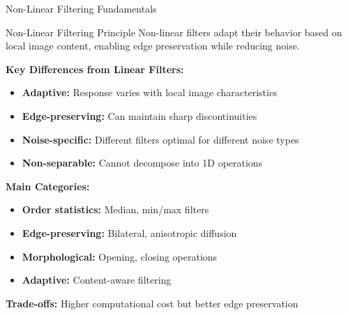 \documentclass[aspectratio=169,10pt]{beamer}
\begin{document}
\begin{frame}{Non-Linear Filtering Fundamentals}
\begin{alertblock}{Non-Linear Filtering Principle}
Non-linear filters adapt their behavior based on local image content, enabling edge preservation while reducing noise.
\end{alertblock}

\textbf{Key Differences from Linear Filters:}
\begin{itemize}
\item \textbf{Adaptive:} Response varies with local image characteristics
\item \textbf{Edge-preserving:} Can maintain sharp discontinuities
\item \textbf{Noise-specific:} Different filters optimal for different noise types
\item \textbf{Non-separable:} Cannot decompose into 1D operations
\end{itemize}

\textbf{Main Categories:}
\begin{itemize}
\item \textbf{Order statistics:} Median, min/max filters
\item \textbf{Edge-preserving:} Bilateral, anisotropic diffusion
\item \textbf{Morphological:} Opening, closing operations
\item \textbf{Adaptive:} Content-aware filtering
\end{itemize}

\textbf{Trade-offs:} Higher computational cost but better edge preservation
\end{frame}
\end{document}
